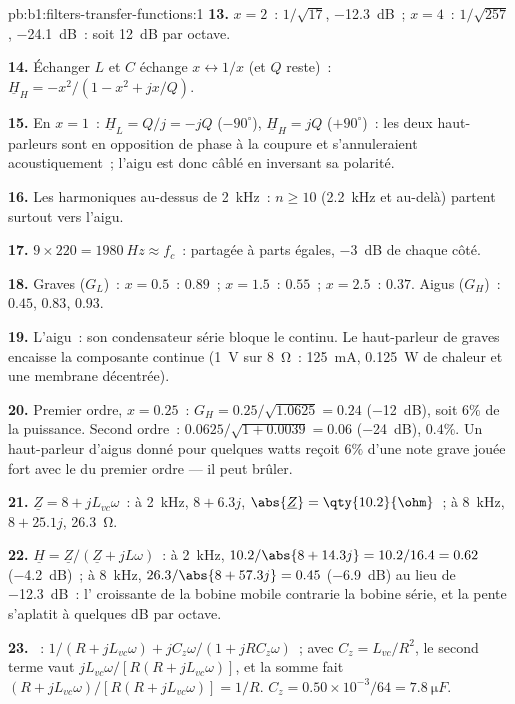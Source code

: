 \begin{solution}{pb:b1:filters-transfer-functions:1}
\textbf{13.} $x = 2$~: $1/\sqrt{17}$, \qty{-12.3}{dB}~; $x = 4$~: $1/\sqrt{257}$,
\qty{-24.1}{dB}~: soit \qty{12}{dB} par octave.

\textbf{14.} Échanger $L$ et $C$ échange $x \leftrightarrow 1/x$ (et
$Q$ reste)~: $\underline H_H = -x^2/(1 - x^2 + jx/Q)$.

\textbf{15.} En $x = 1$~: $\underline H_L = Q/j = -jQ$ ($-90^\circ$),
$\underline H_H = jQ$ ($+90^\circ$)~: les deux haut-parleurs sont en
opposition de phase à la coupure et s'annuleraient acoustiquement~;
l'aigu est donc câblé en inversant sa polarité.

\textbf{16.} Les harmoniques au-dessus de \qty{2}{kHz}~: $n \geq 10$
(\qty{2.2}{kHz} et au-delà) partent surtout vers l'aigu.

\textbf{17.} $9 \times 220 = \qty{1980}{Hz} \approx f_c$~: partagée à
parts égales, \qty{-3}{dB} de chaque côté.

\textbf{18.} Graves ($G_L$)~: $x = 0.5$~: $0.89$~; $x = 1.5$~: $0.55$~; $x = 2.5$~:
$0.37$. Aigus ($G_H$)~: $0.45$, $0.83$, $0.93$.

\textbf{19.} L'aigu~: son condensateur série bloque le continu. Le
haut-parleur de graves encaisse la composante continue (\qty{1}{V} sur
\qty{8}{\ohm}~: \qty{125}{mA}, \qty{0.125}{W} de chaleur et une membrane
décentrée).

\textbf{20.} Premier ordre, $x = 0.25$~: $G_H = 0.25/\sqrt{1.0625} = 0.24$
(\qty{-12}{dB}), soit $6\%$ de la puissance. Second ordre~: $0.0625/\sqrt{1 +
0.0039} = 0.06$ (\qty{-24}{dB}), $0.4\%$. Un haut-parleur d'aigus donné
pour quelques watts reçoit $6\%$ d'une note grave jouée fort avec le
 du premier ordre --- il peut brûler.

\textbf{21.} $\underline Z = 8 + jL_{vc}\omega$~: à \qty{2}{kHz}, $8 + 6.3j$,
$\abs{\underline Z} = \qty{10.2}{\ohm}$~; à \qty{8}{kHz}, $8 + 25.1j$,
\qty{26.3}{\ohm}.

\textbf{22.} $\underline H = \underline Z/(\underline Z + jL\omega)$~: à
\qty{2}{kHz}, $10.2/\abs{8 + 14.3j} = 10.2/16.4 = 0.62$ (\qty{-4.2}{dB})~;
à \qty{8}{kHz}, $26.3/\abs{8 + 57.3j} = 0.45$ (\qty{-6.9}{dB}) au lieu de
\qty{-12.3}{dB}~: l' croissante de la bobine mobile contrarie
la bobine série, et la pente s'aplatit à quelques dB par octave.

\textbf{23.} ~: $1/(R + jL_{vc}\omega) + jC_z\omega/(1 + jRC_z\omega)$~;
avec $C_z = L_{vc}/R^2$, le second terme vaut $jL_{vc}\omega/[R(R +
jL_{vc}\omega)]$, et la somme fait $(R + jL_{vc}\omega)/[R(R + jL_{vc}\omega)]
= 1/R$. $C_z = 0.50\times10^{-3}/64 = \qty{7.8}{\micro F}$.


\end{solution}
